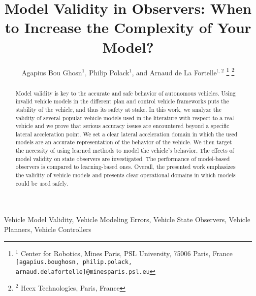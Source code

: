 \documentclass[journal]{IEEEtran}
\begin{document}
\noindent


\title{\LARGE \bf
Model Validity in Observers: When to Increase the Complexity of Your Model?}


\author{
Agapius Bou Ghosn$^{1}$,
Philip Polack$^{1}$,
and Arnaud de La Fortelle$^{1,2}$
\thanks{$^{1}$ Center for Robotics, Mines Paris, PSL University, 75006 Paris, France {\tt [agapius.bou\textunderscore ghosn, philip.polack, arnaud.de\textunderscore la\textunderscore fortelle]@minesparis.psl.eu}}
\thanks{$^{2}$ Heex Technologies, Paris, France}
}


\maketitle

\thispagestyle{empty}
\pagestyle{empty}
\begin{abstract}
Model validity is key to the accurate and safe behavior of autonomous vehicles. Using invalid vehicle models in the different plan and control vehicle frameworks puts the stability of the vehicle, and thus its safety at stake. In this work, we analyze the validity of several popular vehicle models used in the literature with respect to a real vehicle and we prove that serious accuracy issues are encountered beyond a specific lateral acceleration point. We set a clear lateral acceleration domain in which the used models are an accurate representation of the behavior of the vehicle. We then target the necessity of using learned methods to model the vehicle's behavior. The effects of model validity on state observers are investigated. The performance of model-based observers is compared to learning-based ones. Overall, the presented work emphasizes the validity of vehicle models and presents clear operational domains in which models could be used safely. 

\end{abstract}

\begin{IEEEkeywords}
Vehicle Model Validity, Vehicle Modeling Errors, Vehicle State Observers, Vehicle Planners, Vehicle Controllers 
\end{IEEEkeywords}
\end{document}
